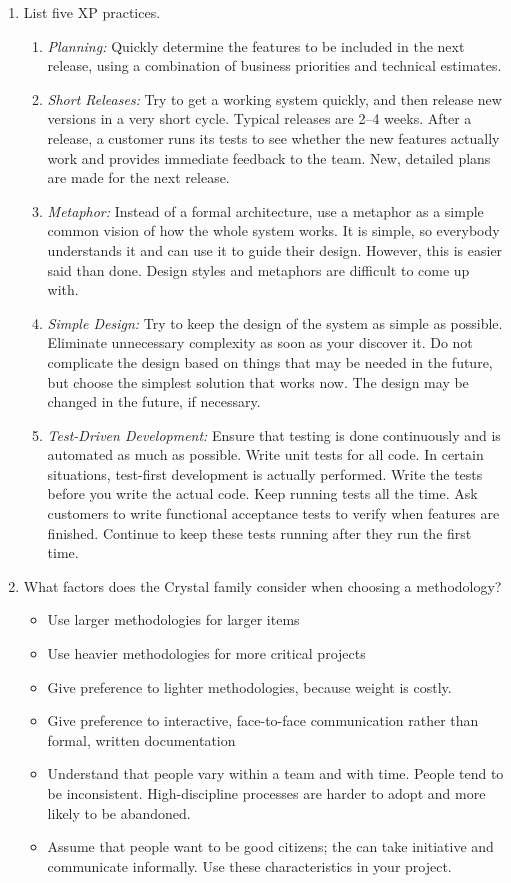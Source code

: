\documentclass[11pt]{article}
\begin{document}
\begin{enumerate}
    \item List five XP practices.
    \begin{enumerate}
        \item \textit{Planning:} Quickly determine the features to be included in the next release, using a combination of business priorities and technical estimates.
        \item \textit{Short Releases:} Try to get a working system quickly, and then release new versions in a very short cycle. Typical releases are 2--4 weeks. After a release, a customer runs its tests to see whether the new features actually work and provides immediate feedback to the team. New, detailed plans are made for the next release.
        \item \textit{Metaphor:} Instead of a formal architecture, use a metaphor as a simple common vision of how the whole system works. It is simple, so everybody understands it and can use it to guide their design. However, this is easier said than done. Design styles and metaphors are difficult to come up with.
        \item \textit{Simple Design:} Try to keep the design of the system as simple as possible. Eliminate unnecessary complexity as soon as your discover it. Do not complicate the design based on things that may be needed in the future, but choose the simplest solution that works now. The design may be changed in the future, if necessary.
        \item \textit{Test-Driven Development:} Ensure that testing is done continuously and is automated as much as possible. Write unit tests for all code. In certain situations, test-first development is actually performed. Write the tests before you write the actual code. Keep running tests all the time. Ask customers to write functional acceptance tests to verify when features are finished. Continue to keep these tests running after they run the first time.
    \end{enumerate}
    
    \item What factors does the Crystal family consider when choosing a methodology?
    \begin{itemize}
        \item Use larger methodologies for larger items
        \item Use heavier methodologies for more critical projects
        \item Give preference to lighter methodologies, because weight is costly. 
        \item Give preference to interactive, face-to-face communication rather than formal, written documentation
        \item Understand that people vary within a team and with time. People tend to be inconsistent. High-discipline processes are harder to adopt and more likely to be abandoned. 
        \item Assume that people want to be good citizens; the can take initiative and communicate informally. Use these characteristics in your project. 
        \end{itemize}
    

\end{enumerate}
\end{document}
